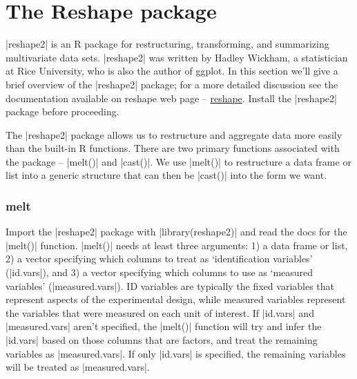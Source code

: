 

\section{The Reshape package}

|reshape2| is an R package for restructuring, transforming, and summarizing multivariate data sets. |reshape2| was written by Hadley Wickham, a statistician at Rice University, who is also the author of ggplot.  In this section we'll give a brief overview of the |reshape2| package; for a more detailed discussion see the documentation available on reshape web page -- \href{http://had.co.nz/reshape/}{reshape}. Install the |reshape2| package before proceeding.

The |reshape2| package allows us to restructure and aggregate data more easily than the built-in R functions.  There are two primary functions associated with the package -- |melt()| and |cast()|.  We use |melt()| to restructure a data frame or list into a generic structure that can then be |cast()| into the form we want.


\subsubsection{melt}

Import the |reshape2| package with |library(reshape2)| and read the docs for the |melt()| function.  |melt()| needs at least three arguments: 1) a data frame or list, 2) a vector specifying which columns to treat as `identification variables' (|id.vars|), and 3) a vector specifying which columns to use as `measured variables' (|measured.vars|).  ID variables are typically the fixed variables that represent aspects of the experimental design, while measured variables represent the variables that were measured on each unit of interest.  If |id.vars| and |measured.vars| aren't specified, the |melt()| function will try and infer the |id.vars| based on those columns that are factors, and treat the remaining variables as |measured.vars|.  If only |id.vars| is specified, the remaining variables will be treated as |measured.vars|.

